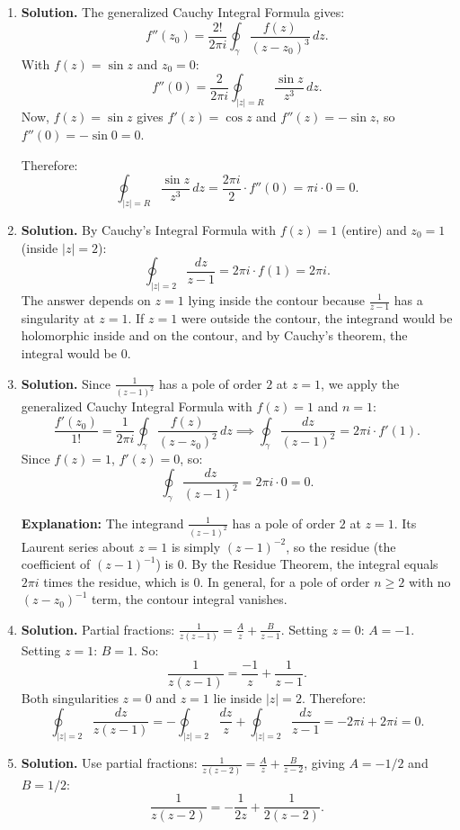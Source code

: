 \begin{enumerate}
\item \textbf{Solution.}
The generalized Cauchy Integral Formula gives:
\[
f''(z_0) = \frac{2!}{2\pi i}\oint_\gamma \frac{f(z)}{(z-z_0)^3}\,dz.
\]
With $f(z) = \sin z$ and $z_0 = 0$:
\[
f''(0) = \frac{2}{2\pi i}\oint_{|z|=R} \frac{\sin z}{z^3}\,dz.
\]
Now, $f(z) = \sin z$ gives $f'(z) = \cos z$ and $f''(z) = -\sin z$, so $f''(0) = -\sin 0 = 0$.

Therefore:
\[
\oint_{|z|=R} \frac{\sin z}{z^3}\,dz = \frac{2\pi i}{2}\cdot f''(0) = \pi i \cdot 0 = 0.
\]

\item \textbf{Solution.}
By Cauchy's Integral Formula with $f(z) = 1$ (entire) and $z_0 = 1$ (inside $|z| = 2$):
\[
\oint_{|z|=2} \frac{dz}{z-1} = 2\pi i \cdot f(1) = 2\pi i.
\]
The answer depends on $z = 1$ lying inside the contour because $\frac{1}{z-1}$ has a singularity at $z = 1$. If $z = 1$ were outside the contour, the integrand would be holomorphic inside and on the contour, and by Cauchy's theorem, the integral would be $0$.

\item \textbf{Solution.}
Since $\frac{1}{(z-1)^2}$ has a pole of order $2$ at $z = 1$, we apply the generalized Cauchy Integral Formula with $f(z) = 1$ and $n = 1$:
\[
\frac{f'(z_0)}{1!} = \frac{1}{2\pi i}\oint_\gamma \frac{f(z)}{(z-z_0)^2}\,dz \implies \oint_\gamma \frac{dz}{(z-1)^2} = 2\pi i \cdot f'(1).
\]
Since $f(z) = 1$, $f'(z) = 0$, so:
\[
\oint_\gamma \frac{dz}{(z-1)^2} = 2\pi i \cdot 0 = 0.
\]

\textbf{Explanation:} The integrand $\frac{1}{(z-1)^2}$ has a pole of order $2$ at $z = 1$. Its Laurent series about $z = 1$ is simply $(z-1)^{-2}$, so the residue (the coefficient of $(z-1)^{-1}$) is $0$. By the Residue Theorem, the integral equals $2\pi i$ times the residue, which is $0$. In general, for a pole of order $n \geq 2$ with no $(z-z_0)^{-1}$ term, the contour integral vanishes.

\item \textbf{Solution.}
Partial fractions: $\frac{1}{z(z-1)} = \frac{A}{z} + \frac{B}{z-1}$. Setting $z = 0$: $A = -1$. Setting $z = 1$: $B = 1$. So:
\[
\frac{1}{z(z-1)} = \frac{-1}{z} + \frac{1}{z-1}.
\]
Both singularities $z = 0$ and $z = 1$ lie inside $|z| = 2$. Therefore:
\[
\oint_{|z|=2} \frac{dz}{z(z-1)} = -\oint_{|z|=2}\frac{dz}{z} + \oint_{|z|=2}\frac{dz}{z-1} = -2\pi i + 2\pi i = 0.
\]

\item \textbf{Solution.}
Use partial fractions: $\frac{1}{z(z-2)} = \frac{A}{z} + \frac{B}{z-2}$, giving $A = -1/2$ and $B = 1/2$:
\[
\frac{1}{z(z-2)} = -\frac{1}{2z} + \frac{1}{2(z-2)}.
\]


\end{enumerate}
